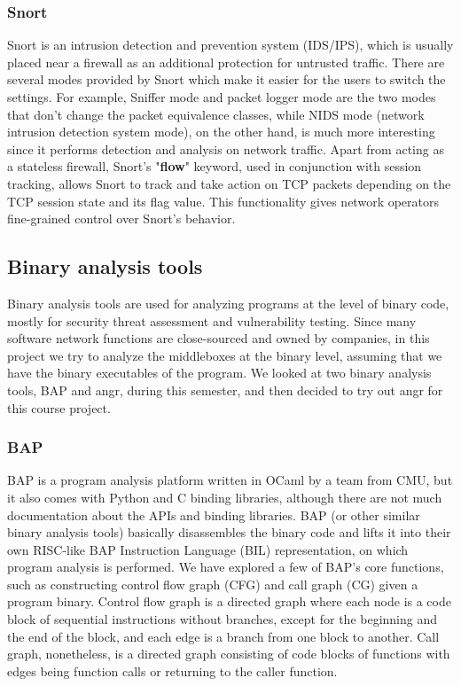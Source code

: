 \subsubsection{Snort}

Snort is an intrusion detection and prevention system (IDS/IPS), which is
usually placed near a firewall as an additional protection for untrusted
traffic. There are several modes provided by Snort which make it easier for the
users to switch the settings. For example, Sniffer mode and packet logger mode
are the two modes that don't change the packet equivalence classes, while NIDS
mode (network intrusion detection system mode), on the other hand, is much more
interesting since it performs detection and analysis on network traffic. Apart
from acting as a stateless firewall, Snort's "\textbf{flow}" keyword, used in
conjunction with session tracking, allows Snort to track and take action on TCP
packets depending on the TCP session state and its flag value. This
functionality gives network operators fine-grained control over Snort's
behavior.


\subsection{Binary analysis tools}

Binary analysis tools are used for analyzing programs at the level of binary
code, mostly for security threat assessment and vulnerability testing. Since
many software network functions are close-sourced and owned by companies, in
this project we try to analyze the middleboxes at the binary level, assuming
that we have the binary executables of the program. We looked at two binary
analysis tools, BAP and angr, during this semester, and then decided to try out
angr for this course project.

\subsubsection{BAP}

BAP is a program analysis platform written in OCaml by a team from CMU, but it
also comes with Python and C binding libraries, although there are not much
documentation about the APIs and binding libraries. BAP (or other similar binary
analysis tools) basically disassembles the binary code and lifts it into their
own RISC-like BAP Instruction Language (BIL) representation, on which program
analysis is performed. We have explored a few of BAP's core functions, such as
constructing control flow graph (CFG) and call graph (CG) given a program
binary. Control flow graph is a directed graph where each node is a code block
of sequential instructions without branches, except for the beginning and the
end of the block, and each edge is a branch from one block to another. Call
graph, nonetheless, is a directed graph consisting of code blocks of functions
with edges being function calls or returning to the caller function.

